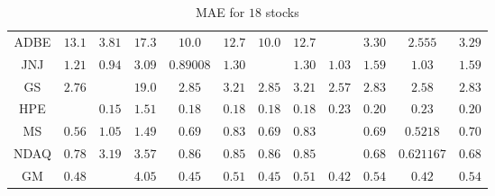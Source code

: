 \documentclass[12pt, A4]{article}
\begin{document}
\begin{landscape}
\begin{table}[H]
\begin{center}
\begin{tabular}{| c | c | c | c | c | c | c | c | c | c | c | c |}
				ADBE & $13.1$ & $3.81$ & $17.3$ & $10.0$ & $12.7$ & $10.0$ & $12.7$ &\cellcolor{blue!25}   \boldmath{$2.552$} & $3.30$ & $2.555$ & $3.29$\\ \cline{1-12}
				JNJ & $1.21$ & $0.94$ & $3.09$ & $0.89008$ & $1.30$ & \cellcolor{blue!25}  \boldmath{$0.89001$} & $1.30$ & $1.03$ & $1.59$ & $1.03$ & $1.59$\\ \cline{1-12}
				GS & $2.76$ & \cellcolor{blue!25} \boldmath{$2.49$} & $19.0$ & $2.85$ & $3.21$ & $2.85$ & $3.21$ & $2.57$ & $2.83$ & $2.58$ & $2.83$\\ \cline{1-12}
				HPE & \cellcolor{blue!25} \boldmath{$0.14$} & $0.15$ & $1.51$ & $0.18$ & $0.18$ & $0.18$ & $0.18$ & $0.23$ & $0.20$ & $0.23$ & $0.20$\\ \cline{1-12}
				MS & $0.56$ & $1.05$ & $1.49$ & $0.69$ & $0.83$ & $0.69$ & $0.83$ &\cellcolor{blue!25}  \boldmath{$0.5214$} & $0.69$ & $0.5218$ & $0.70$\\ \cline{1-12}
				NDAQ & $0.78$ & $3.19$ & $3.57$ & $0.86$ & $0.85$ & $0.86$ & $0.85$ & \cellcolor{blue!25} \boldmath{$0.621164$} & $0.68$ & $0.621167$ & $0.68$\\ \cline{1-12}
				GM & $0.48$ & \cellcolor{blue!25} \boldmath{$0.41$} & $4.05$ & $0.45$ & $0.51$ & $0.45$ & $0.51$ & $0.42$ & $0.54$ & $0.42$ & $0.54$\\ \cline{1-12}
			\end{tabular}
			\caption{MAE for $18$ stocks} \label{stocks MAE_results}
		\end{center}
	\end{table}
\end{landscape}
\end{document}
